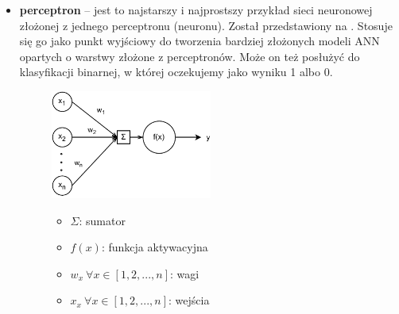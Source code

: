 \begin{itemize}
    \item \textbf{perceptron} -- jest to najstarszy i najprostszy przykład sieci neuronowej złożonej z jednego perceptronu (neuronu). Został przedstawiony na . Stosuje się go jako punkt wyjściowy do tworzenia bardziej złożonych modeli ANN opartych o warstwy złożone z perceptronów. Może on też posłużyć do klasyfikacji binarnej, w której oczekujemy jako wyniku 1 albo 0.
\begin{figure}[H]
    \centering
    \includegraphics[width=0.5\textwidth]{images/neuron}
    \begin{itemize}
        \item[] $\Sigma$: sumator
        \item[] $f(x)$: funkcja aktywacyjna
        \item[] $w_x \  \forall x \in [1, 2, ..., n]$: wagi
        \item[] $x_x \  \forall x \in [1, 2, ..., n]$: wejścia
    \end{itemize}
    \label{fig:neuron}
\end{figure}


\end{itemize}
